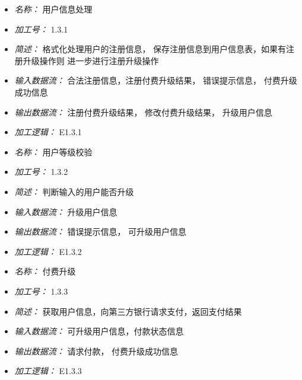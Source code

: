 \vspace{-1mm}


\begin{itemize}
\item \textit{名称： } 用户信息处理
\item \textit{加工号： } 1.3.1
\item \textit{简述： } 格式化处理用户的注册信息， 保存注册信息到用户信息表，如果有注册升级操作则 进一步进行注册升级操作
\item \textit{输入数据流： } 合法注册信息，注册付费升级结果， 错误提示信息， 付费升级成功信息 
\item \textit{输出数据流： } 注册付费升级结果， 修改付费升级结果， 升级用户信息
\item \textit{加工逻辑： } E1.3.1

\end{itemize}


\vspace{-1mm}


\begin{itemize}
\item \textit{名称： } 用户等级校验
\item \textit{加工号： } 1.3.2
\item \textit{简述： } 判断输入的用户能否升级 
\item \textit{输入数据流： } 升级用户信息 
\item \textit{输出数据流： } 错误提示信息， 可升级用户信息
\item \textit{加工逻辑： } E1.3.2

\end{itemize}


\vspace{-1mm}


\begin{itemize}
\item \textit{名称： } 付费升级
\item \textit{加工号： } 1.3.3
\item \textit{简述： } 获取用户信息，向第三方银行请求支付，返回支付结果 
\item \textit{输入数据流： } 可升级用户信息，付款状态信息
\item \textit{输出数据流： } 请求付款， 付费升级成功信息
\item \textit{加工逻辑： } E1.3.3

\end{itemize}


\vspace{-1mm}



